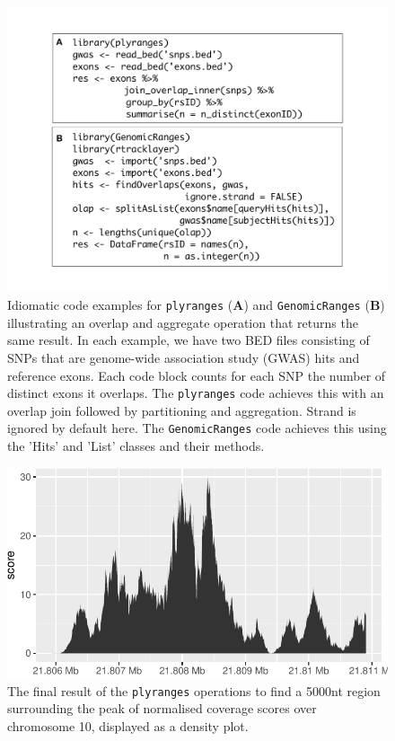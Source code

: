 \documentclass[]{article}
\begin{document}
\begin{figure}
\includegraphics[width=\textwidth]{diagrams/code-comparison.pdf}
\caption{Idiomatic code examples for \texttt{plyranges} (\textbf{A}) and 
\texttt{GenomicRanges} (\textbf{B}) illustrating an overlap and aggregate 
operation that returns the same result. 
In each example, we have two BED files consisting of SNPs that are
genome-wide association study (GWAS) hits and reference exons. Each code block
counts for each SNP the number of distinct exons it overlaps. The 
\texttt{plyranges} code achieves this with an overlap join followed by partitioning
and aggregation. Strand is ignored by default here. 
The \texttt{GenomicRanges} code achieves this using the 'Hits' and 'List' 
classes and their methods.}
\label{fig:code}
\end{figure}

\begin{figure}

{\centering \includegraphics{./diagrams/peak-viz-1} 

}

\caption{The final result of the \texttt{plyranges} operations to find a 5000nt region surrounding the peak of normalised coverage scores over chromosome 10, displayed as a density plot.}\label{fig:peak-viz}
\end{figure}
\end{document}
